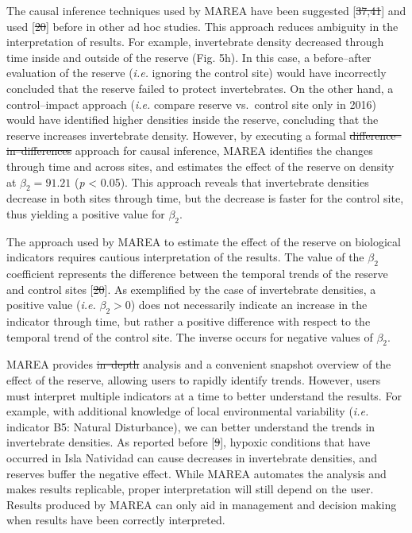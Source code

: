 \documentclass[12pt,]{article}
\providecommand{\DIFaddtex}[1]{{\protect\color{blue}\uwave{#1}}} %
\providecommand{\DIFdeltex}[1]{{\protect\color{red}\sout{#1}}}                      %
\providecommand{\DIFaddbegin}{} %
\providecommand{\DIFaddend}{} %
\providecommand{\DIFdelbegin}{} %
\providecommand{\DIFdelend}{} %
\providecommand{\DIFadd}[1]{\texorpdfstring{\DIFaddtex{#1}}{#1}} %
\providecommand{\DIFdel}[1]{\texorpdfstring{\DIFdeltex{#1}}{}} %
\newcommand{\DIFscaledelfig}{0.5}
\newlength{\DIFdelgraphicswidth} %
\newlength{\DIFdelgraphicsheight} %
\newcommand{\DIFaddincludegraphics}[2][]{{\color{blue}\fbox{\DIFOincludegraphics[#1]{#2}}}} %
\newcommand{\DIFdelincludegraphics}[2][]{%
\sbox{\DIFdelgraphicsbox}{\DIFOincludegraphics[#1]{#2}}%
\settoboxwidth{\DIFdelgraphicswidth}{\DIFdelgraphicsbox} %
\settoboxtotalheight{\DIFdelgraphicsheight}{\DIFdelgraphicsbox} %
\scalebox{\DIFscaledelfig}{%
\parbox[b]{\DIFdelgraphicswidth}{\usebox{\DIFdelgraphicsbox}\\[-\baselineskip] \rule{\DIFdelgraphicswidth}{0em}}\llap{\resizebox{\DIFdelgraphicswidth}{\DIFdelgraphicsheight}{%
\setlength{\unitlength}{\DIFdelgraphicswidth}%
\begin{picture}(1,1)%
\thicklines\linethickness{2pt} %
{\color[rgb]{1,0,0}\put(0,0){\framebox(1,1){}}}%
{\color[rgb]{1,0,0}\put(0,0){\line( 1,1){1}}}%
{\color[rgb]{1,0,0}\put(0,1){\line(1,-1){1}}}%
\end{picture}%
}\hspace*{3pt}}} %
} %
\DeclareRobustCommand{\DIFaddbegin}{\DIFOaddbegin \let\includegraphics\DIFaddincludegraphics} %
\DeclareRobustCommand{\DIFaddend}{\DIFOaddend \let\includegraphics\DIFOincludegraphics} %
\DeclareRobustCommand{\DIFdelbegin}{\DIFOdelbegin \let\includegraphics\DIFdelincludegraphics} %
\DeclareRobustCommand{\DIFdelend}{\DIFOaddend \let\includegraphics\DIFOincludegraphics} %
\begin{document}
The causal inference techniques used by MAREA have been suggested
{[}\DIFdelbegin \DIFdel{37,41}\DIFdelend \DIFaddbegin \DIFadd{38,47}\DIFaddend {]} and used {[}\DIFdelbegin \DIFdel{20}\DIFdelend \DIFaddbegin \DIFadd{21}\DIFaddend {]} before in other ad hoc studies. This
approach reduces ambiguity in the interpretation of results. For
example, invertebrate density decreased through time inside and outside
of the reserve (Fig. 5h). In this case, a before--after evaluation of
the reserve (\emph{i.e.} ignoring the control site) would have
incorrectly concluded that the reserve failed to protect invertebrates.
On the other hand, a control--impact approach (\emph{i.e.} compare
reserve vs.~control site only in 2016) would have identified higher
densities inside the reserve, concluding that the reserve increases
invertebrate density. However, by executing a formal
\DIFdelbegin \DIFdel{difference--in--differences }\DIFdelend \DIFaddbegin \DIFadd{difference-in-differences }\DIFaddend approach for causal inference, MAREA
identifies the changes through time and across sites, and estimates the
effect of the reserve on density at \(\beta_2 = 91.21\) (\emph{p}
\textless{} 0.05). This approach reveals that invertebrate densities
decrease in both sites through time, but the decrease is faster for the
control site, thus yielding a positive value for \(\beta_2\).

The approach used by MAREA to estimate the effect of the reserve on
biological indicators requires cautious interpretation of the results.
The value of the \(\beta_2\) coefficient represents the difference
between the temporal trends of the reserve and control sites {[}\DIFdelbegin \DIFdel{20}\DIFdelend \DIFaddbegin \DIFadd{21}\DIFaddend {]}.
As exemplified by the case of invertebrate densities, a positive value
(\emph{i.e.} \(\beta_2 > 0\)) does not necessarily indicate an increase
in the indicator through time, but rather a positive difference with
respect to the temporal trend of the control site. The inverse occurs
for negative values of \(\beta_2\).

MAREA provides \DIFdelbegin \DIFdel{in--depth }\DIFdelend \DIFaddbegin \DIFadd{in-depth }\DIFaddend analysis and a convenient snapshot overview of
the effect of the reserve, allowing users to rapidly identify trends.
However, users must interpret multiple indicators at a time to better
understand the results. For example, with additional knowledge of local
environmental variability (\emph{i.e.} indicator B5: Natural
Disturbance), we can better understand the trends in invertebrate
densities. As reported before {[}\DIFdelbegin \DIFdel{9}\DIFdelend \DIFaddbegin \DIFadd{8}\DIFaddend {]}, hypoxic conditions that have
occurred in Isla Natividad can cause decreases in invertebrate
densities, and reserves buffer the negative effect. While MAREA
automates the analysis and makes results replicable, proper
interpretation will still depend on the user. Results produced by MAREA
can only aid in management and decision making when results have been
correctly interpreted.
\end{document}
